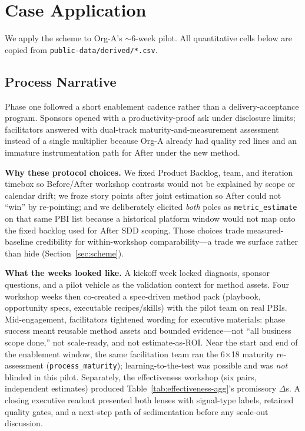 \documentclass[10pt,conference]{IEEEtran}
\begin{document}
\section{Case Application}
\label{sec:case}

We apply the scheme to Org-A's $\sim$6-week pilot.
All quantitative cells below are copied from \texttt{public-data/derived/*.csv}.

\subsection{Process Narrative}
\label{sec:case-process}

Phase one followed a short enablement cadence rather than a delivery-acceptance program.
Sponsors opened with a productivity-proof ask under disclosure limits; facilitators answered with dual-track maturity-and-measurement assessment instead of a single multiplier because Org-A already had quality red lines and an immature instrumentation path for After under the new method.

\textbf{Why these protocol choices.}
We fixed Product Backlog, team, and iteration timebox so Before/After workshop contrasts would not be explained by scope or calendar drift; we froze story points after joint estimation so After could not ``win'' by re-pointing; and we deliberately elicited \emph{both} poles as \texttt{metric\_estimate} on that same PBI list because a historical platform window would not map onto the fixed backlog used for After SDD scoping.
Those choices trade measured-baseline credibility for within-workshop comparability---a trade we surface rather than hide (Section~\ref{sec:scheme}).

\textbf{What the weeks looked like.}
A kickoff week locked diagnosis, sponsor questions, and a pilot vehicle as the validation context for method assets.
Four workshop weeks then co-created a spec-driven method pack (playbook, opportunity specs, executable recipes/skills) with the pilot team on real PBIs.
Mid-engagement, facilitators tightened wording for executive materials: phase success meant reusable method assets and bounded evidence---not ``all business scope done,'' not scale-ready, and not estimate-as-ROI.
Near the start and end of the enablement window, the same facilitation team ran the 6$\times$18 maturity re-assessment (\texttt{process\_maturity}); learning-to-the-test was possible and was \emph{not} blinded in this pilot.
Separately, the effectiveness workshop (six pairs, independent estimates) produced Table~\ref{tab:effectiveness-agg}'s promissory $\Delta$s.
A closing executive readout presented both lenses with signal-type labels, retained quality gates, and a next-step path of sedimentation before any scale-out discussion.
\end{document}

